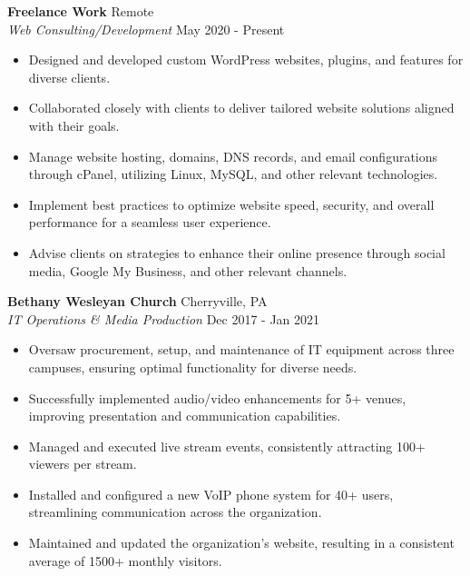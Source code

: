 \documentclass[letterpaper]{article}
\begin{document}
\textbf{Freelance Work} \hfill Remote \\
\textit{Web Consulting/Development} \hfill May 2020 - Present\\
\vspace{-1mm}
\begin{itemize} \itemsep -1pt
	\item Designed and developed custom WordPress websites, plugins, and features for diverse clients.
	\item Collaborated closely with clients to deliver tailored website solutions aligned with their goals.
	\item Manage website hosting, domains, DNS records, and email configurations through cPanel, utilizing Linux, MySQL, and other relevant technologies.
	\item Implement best practices to optimize website speed, security, and overall performance for a seamless user experience.
	\item Advise clients on strategies to enhance their online presence through social media, Google My Business, and other relevant channels.
\end{itemize}
\textbf{Bethany Wesleyan Church} \hfill Cherryville, PA\\
\textit{IT Operations \& Media Production} \hfill Dec 2017 - Jan 2021\\
\vspace{-1mm}
\begin{itemize} \itemsep -1pt
	\item Oversaw procurement, setup, and maintenance of IT equipment across three campuses, ensuring optimal functionality for diverse needs.
	\item Successfully implemented audio/video enhancements for 5+ venues, improving presentation and communication capabilities.
	\item Managed and executed live stream events, consistently attracting 100+ viewers per stream.
    \item Installed and configured a new VoIP phone system for 40+ users, streamlining communication across the organization.
    \item Maintained and updated the organization's website, resulting in a consistent average of 1500+ monthly visitors.
\end{itemize}
\end{document}
